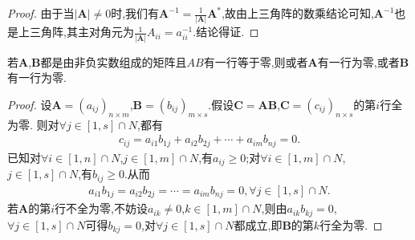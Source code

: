\documentclass[../../main.tex]{subfiles}%
\begin{document}
\begin{proof}
由于当$\left| \boldsymbol{A} \right|\ne 0$时,我们有$\boldsymbol{A}^{-1}=\frac{1}{\left| \boldsymbol{A} \right|}\boldsymbol{A}^*$,故由上三角阵的数乘结论可知,$\boldsymbol{A}^{-1}$也是上三角阵,其主对角元为$\frac{1}{\left| \boldsymbol{A} \right|}A_{ii}=a_{ii}^{-1}$.结论得证.

\end{proof}

\begin{proposition}
若\(\boldsymbol{A}\),\(\boldsymbol{B}\)都是由非负实数组成的矩阵且\(AB\)有一行等于零,则或者\(\boldsymbol{A}\)有一行为零,或者\(\boldsymbol{B}\)有一行为零.
\end{proposition}
\begin{proof}

设\(\boldsymbol{A} = (a_{ij})_{n\times m}\),\(\boldsymbol{B} = (b_{ij})_{m\times s}\).假设\(\boldsymbol{C} = \boldsymbol{AB}\),\(\boldsymbol{C} = (c_{ij})_{n\times s}\)的第\(i\)行全为零.
则对\(\forall j\in [1,s]\cap N\),都有
\begin{align*}
c_{ij} = a_{i1}b_{1j} + a_{i2}b_{2j} + \cdots + a_{im}b_{nj} = 0 .
\end{align*}
已知对\(\forall i\in [1,n]\cap N\),\(j\in [1,m]\cap N\),有\(a_{ij} \geqslant  0\);对\(\forall i\in [1,m]\cap N\),\(j\in [1,s]\cap N\),有\(b_{ij} \geqslant  0\).从而
\begin{align*}
a_{i1}b_{1j} = a_{i2}b_{2j} = \cdots = a_{im}b_{nj} = 0,\forall j\in [1,s]\cap N.
\end{align*}
若\(\boldsymbol{A}\)的第\(i\)行不全为零,不妨设\(a_{ik} \neq 0\),\(k\in [1,m]\cap N\),则由\(a_{ik}b_{kj} = 0\),\(\forall j\in [1,s]\cap N\)可得\(b_{kj} = 0\),对\(\forall j\in [1,s]\cap N\)都成立,即\(\boldsymbol{B}\)的第\(k\)行全为零. 

\end{proof}
\end{document}
